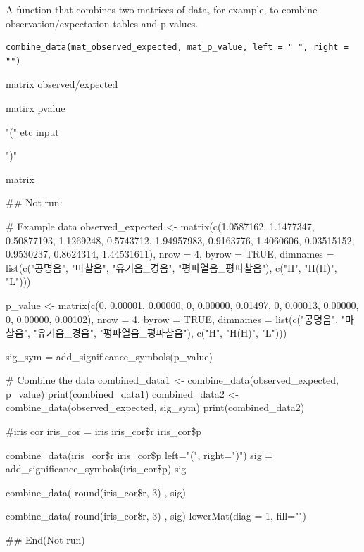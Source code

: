 \documentclass[a4paper]{book}
\begin{document}
%
\begin{Description}
A function that combines two matrices of data, for example, to combine observation/expectation tables and p-values.
\end{Description}
%
\begin{Usage}
\begin{verbatim}
combine_data(mat_observed_expected, mat_p_value, left = " ", right = "")
\end{verbatim}
\end{Usage}
%
\begin{Arguments}
\begin{ldescription}
\item[\code{mat\_observed\_expected}] matrix  observed/expected

\item[\code{mat\_p\_value}] matirx pvalue

\item[\code{left}] "(" etc input

\item[\code{right}] ")"
\end{ldescription}
\end{Arguments}
%
\begin{Value}
matrix


\#\# Not run: 

\# Example data
observed\_expected <- matrix(c(1.0587162, 1.1477347, 0.50877193,
                              1.1269248, 0.5743712, 1.94957983,
                              0.9163776, 1.4060606, 0.03515152,
                              0.9530237, 0.8624314, 1.44531611),
                            nrow = 4, byrow = TRUE,
         dimnames = list(c("공명음", "마찰음", "유기음\_경음", "평파열음\_평파찰음"),
                           c("H", "H(H)", "L")))

p\_value <- matrix(c(0, 0.00001, 0.00000,
                    0, 0.00000, 0.01497,
                    0, 0.00013, 0.00000,
                    0, 0.00000, 0.00102),
                  nrow = 4, byrow = TRUE,
       dimnames = list(c("공명음", "마찰음", "유기음\_경음", "평파열음\_평파찰음"),
                      c("H", "H(H)", "L")))

sig\_sym = add\_significance\_symbols(p\_value)

\# Combine the data
combined\_data1 <- combine\_data(observed\_expected, p\_value)
 print(combined\_data1)
combined\_data2 <- combine\_data(observed\_expected, sig\_sym)
 print(combined\_data2)

\#iris cor
iris\_cor = iris 
iris\_cor\$r
iris\_cor\$p

combine\_data(iris\_cor\$r
             iris\_cor\$p
             left="(", right=")")
 sig = add\_significance\_symbols(iris\_cor\$p)
 sig

 combine\_data( round(iris\_cor\$r, 3) , sig)

 combine\_data( round(iris\_cor\$r, 3) , sig) 
 lowerMat(diag = 1, fill="")

## End(Not run)
\end{Value}
\end{document}
